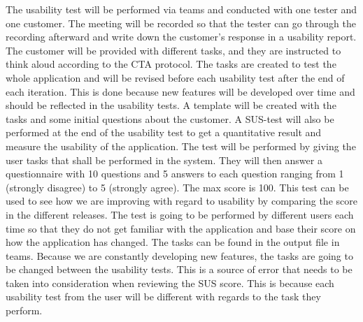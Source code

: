 \noindent The usability test will be performed via teams and conducted with one tester and one customer. The meeting will be recorded so that the tester can go through the recording afterward and write down the customer's response in a usability report. The customer will be provided with different tasks, and they are instructed to think aloud according to the CTA protocol. The tasks are created to test the whole application and will be revised before each usability test after the end of each iteration. This is done because new features will be developed over time and should be reflected in the usability tests. A template will be created with the tasks and some initial questions about the customer. A SUS-test will also be performed at the end of the usability test to get a quantitative result and measure the usability of the application. The test will be performed by giving the user tasks that shall be performed in the system. They will then answer a questionnaire with 10 questions and 5 answers to each question ranging from 1 (strongly disagree) to 5 (strongly agree). The max score is 100. This test can be used to see how we are improving with regard to usability by comparing the score in the different releases. The test is going to be performed by different users each time so that they do not get familiar with the application and base their score on how the application has changed. The tasks can be found in the output file in teams. Because we are constantly developing new features, the tasks are going to be changed between the usability tests. This is a source of error that needs to be taken into consideration when reviewing the SUS score. This is because each usability test from the user will be different with regards to the task they perform.\
\newline


